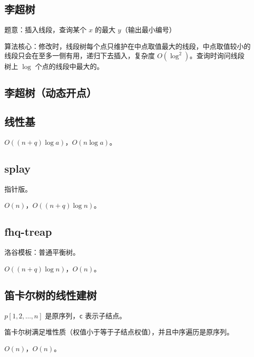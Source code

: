 \documentclass[12pt]{ctexart}
\begin{document}
\subsection{李超树}

题意：插入线段，查询某个 $x$ 的最大 $y$（输出最小编号）

算法核心：修改时，线段树每个点只维护在中点取值最大的线段，中点取值较小的线段只会在至多一侧有用，递归下去插入，复杂度 $O(\log^2)$。查询时询问线段树上 $\log$ 个点的线段中最大的。



\subsection{李超树（动态开点）}



\subsection{线性基}

$O((n+q)\log a)$，$O(n\log a)$。



\subsection{splay}

指针版。

$O(n)$，$O((n+q)\log n)$。



\subsection{fhq-treap}

洛谷模板：普通平衡树。

$O((n+q)\log n)$，$O(n)$。



\subsection{笛卡尔树的线性建树}

$p[1,2,\ldots,n]$ 是原序列，\verb|c| 表示子结点。

笛卡尔树满足堆性质（权值小于等于子结点权值），并且中序遍历是原序列。

$O(n)$，$O(n)$。
\end{document}

